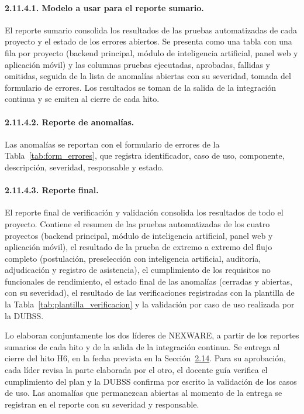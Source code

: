 \paragraph{2.11.4.1. Modelo a usar para el reporte sumario.}

El reporte sumario consolida los resultados de las pruebas automatizadas de cada proyecto y el estado de los errores abiertos. Se presenta como una tabla con una fila por proyecto (backend principal, módulo de inteligencia artificial, panel web y aplicación móvil) y las columnas pruebas ejecutadas, aprobadas, fallidas y omitidas, seguida de la lista de anomalías abiertas con su severidad, tomada del formulario de errores. Los resultados se toman de la salida de la integración continua y se emiten al cierre de cada hito.

\paragraph{2.11.4.2. Reporte de anomalías.}

Las anomalías se reportan con el formulario de errores de la Tabla~\ref{tab:form_errores}, que registra identificador, caso de uso, componente, descripción, severidad, responsable y estado.

\paragraph{2.11.4.3. Reporte final.}

El reporte final de verificación y validación consolida los resultados de todo el proyecto. Contiene el resumen de las pruebas automatizadas de los cuatro proyectos (backend principal, módulo de inteligencia artificial, panel web y aplicación móvil), el resultado de la prueba de extremo a extremo del flujo completo (postulación, preselección con inteligencia artificial, auditoría, adjudicación y registro de asistencia), el cumplimiento de los requisitos no funcionales de rendimiento, el estado final de las anomalías (cerradas y abiertas, con su severidad), el resultado de las verificaciones registradas con la plantilla de la Tabla~\ref{tab:plantilla_verificacion} y la validación por caso de uso realizada por la DUBSS.

Lo elaboran conjuntamente los dos líderes de NEXWARE, a partir de los reportes sumarios de cada hito y de la salida de la integración continua. Se entrega al cierre del hito H6, en la fecha prevista en la Sección~\hyperref[sec:agenda_sqap]{2.14}. Para su aprobación, cada líder revisa la parte elaborada por el otro, el docente guía verifica el cumplimiento del plan y la DUBSS confirma por escrito la validación de los casos de uso. Las anomalías que permanezcan abiertas al momento de la entrega se registran en el reporte con su severidad y responsable.

